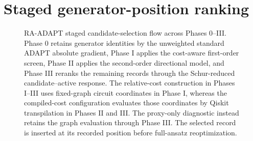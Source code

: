 \documentclass[
  reprint,
  amsmath,
  amssymb,
  aps,
  pra,
  nofootinbib,
  superscriptaddress,
  floatfix
]{revtex4-2}
\begin{document}
\section{Staged generator-position ranking}
\label{sec:static_method}
%
\begin{figure}[t]
\centering
\setlength{\fboxsep}{6pt}
\caption{RA-ADAPT staged candidate-selection flow across Phases 0--III.
Phase 0 retains generator identities by the unweighted standard ADAPT absolute
gradient, Phase I applies the cost-aware first-order screen, Phase II applies
the second-order directional model, and Phase III reranks the remaining
records through the Schur-reduced candidate--active response. The relative-cost
construction in Phases I--III uses fixed-graph circuit coordinates in Phase I,
whereas the compiled-cost configuration evaluates those coordinates by
Qiskit transpilation in Phases II and III. The proxy-only diagnostic
instead retains the graph evaluation through Phase III.
The selected record is inserted at
its recorded position before full-ansatz reoptimization.}
\label{fig:static_adapt_selector_flow}
\end{figure}
\end{document}
